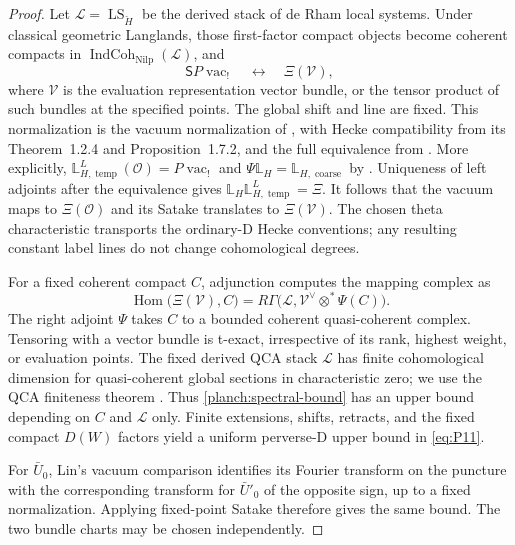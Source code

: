 \begin{proof}
Let $\mathcal L=\operatorname{LS}_{\check H}$ be the derived stack
of de Rham local systems.  Under classical geometric Langlands,
those first-factor compact objects become coherent compacts in
$\operatorname{IndCoh}_{\operatorname{Nilp}}(\mathcal L)$, and
\[
 \mathsf S P\operatorname{vac}_!
 \quad\longleftrightarrow\quad
 \Xi(\mathcal V),
\]
where $\mathcal V$ is the evaluation representation vector bundle,
or the tensor product of such bundles at the specified points.
The global shift and line are fixed.  This normalization is the
vacuum normalization of \cite[Sections~1.3--1.4]{GLCI}, with Hecke
compatibility from its Theorem~1.2.4 and Proposition~1.7.2, and the full equivalence from
\cite{GLCV}.  More explicitly,
$\mathbb L^L_{H,\operatorname{temp}}(\mathcal O)
=P\operatorname{vac}_!$ and
$\Psi\mathbb L_H=\mathbb L_{H,\operatorname{coarse}}$ by
\cite[Corollary~1.6.5]{GLCI}.  Uniqueness of left adjoints after the
equivalence gives
$\mathbb L_H\mathbb L^L_{H,\operatorname{temp}}=\Xi$.
It follows that the vacuum maps to $\Xi(\mathcal O)$ and its
Satake translates to $\Xi(\mathcal V)$.
The chosen theta characteristic transports the ordinary-D Hecke
conventions; any resulting constant label lines do not change
cohomological degrees.

For a fixed coherent compact $C$, adjunction computes the mapping
complex as
\begin{equation}
 \operatorname{Hom}\bigl(\Xi(\mathcal V),C\bigr)
   =R\Gamma\bigl(\mathcal L,
                    \mathcal V^\vee\otimes^*\Psi(C)\bigr).
 \label{planch:spectral-bound}
\end{equation}
The right adjoint $\Psi$ takes $C$ to a bounded coherent
quasi-coherent complex.  Tensoring with a vector bundle is t-exact,
irrespective of its rank, highest weight, or evaluation points.
The fixed derived QCA stack $\mathcal L$ has finite cohomological
dimension for quasi-coherent global sections in characteristic
zero; we use the QCA finiteness theorem
\cite{DrinfeldGaitsgoryFiniteness}.  Thus
\eqref{planch:spectral-bound} has an upper bound depending on $C$
and $\mathcal L$ only.  Finite extensions, shifts, retracts, and
the fixed compact $D(W)$ factors yield a uniform perverse-D upper
bound in \eqref{eq:P11}.

For $\bar U_0$, Lin's vacuum comparison identifies its Fourier
transform on the puncture with the corresponding transform for
$\bar U'_0$ of the opposite sign, up to a fixed normalization.
Applying fixed-point Satake therefore gives the same bound.  The two
bundle charts may be chosen independently.


\end{proof}
